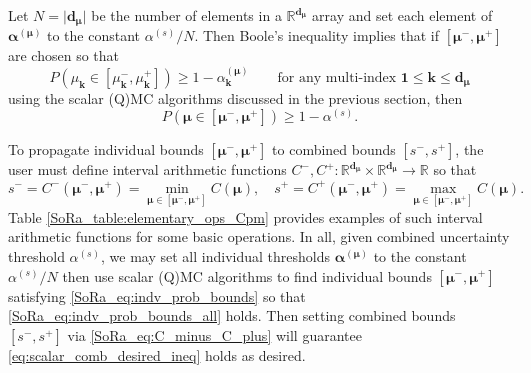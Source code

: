 \documentclass[graybox]{svmult}
\begin{document}
Let $N = \lvert \boldsymbol{d}_{\boldsymbol{\mu}} \rvert$ be the number of elements in a $\mathbb{R}^{\boldsymbol{d}_{\boldsymbol{\mu}}}$ array and set each element of $\boldsymbol{\alpha}^{(\boldsymbol{\mu})}$ to the constant $\alpha^{(s)}/ N$. Then Boole's inequality \cite{boole1847mathematical} implies that if $[\boldsymbol{\mu}^-,\boldsymbol{\mu}^+]$ are chosen so that
\begin{equation}
    P(\mu_{\boldsymbol{k}} \in [\mu_{\boldsymbol{k}}^-,\mu_{\boldsymbol{k}}^+]) \geq 1-\alpha_{\boldsymbol{k}}^{(\boldsymbol{\mu})}  \qquad \text{for any multi-index }\boldsymbol{1} \leq \boldsymbol{k} \leq \boldsymbol{d}_{\boldsymbol{\mu}}
    \label{SoRa_eq:indv_prob_bounds}
\end{equation}
using the scalar (Q)MC algorithms discussed in the previous section, then  
\begin{equation}
    P(\boldsymbol{\mu} \in [\boldsymbol{\mu}^-,\boldsymbol{\mu}^+]) \geq 1-\alpha^{(s)}.
    \label{SoRa_eq:indv_prob_bounds_all}
\end{equation}

To propagate individual bounds $[\boldsymbol{\mu}^-,\boldsymbol{\mu}^+]$ to combined bounds $[s^-,s^+]$, the user must define interval arithmetic \cite{interval_analysis} functions $C^-,C^+: \mathbb{R}^{\boldsymbol{d}_{\boldsymbol{\mu}}} \times \mathbb{R}^{\boldsymbol{d}_{\boldsymbol{\mu}}} \to \mathbb{R}$ so that
\begin{equation}
    s^- = C^-(\boldsymbol{\mu}^-,\boldsymbol{\mu}^+) = \min_{\boldsymbol{\mu} \in [\boldsymbol{\mu}^-,\boldsymbol{\mu}^+]} C(\boldsymbol{\mu}), \quad 
    s^+= C^+(\boldsymbol{\mu}^-,\boldsymbol{\mu}^+) = \max_{\boldsymbol{\mu} \in [\boldsymbol{\mu}^-,\boldsymbol{\mu}^+]} C(\boldsymbol{\mu}).
    \label{SoRa_eq:C_minus_C_plus}
\end{equation}
Table \ref{SoRa_table:elementary_ops_Cpm} provides examples of such interval arithmetic functions for some basic operations. In all, given combined uncertainty threshold $\alpha^{(s)}$, we may set all individual thresholds $\boldsymbol{\alpha}^{(\boldsymbol{\mu})}$ to the constant $\alpha^{(s)}/N$ then use scalar (Q)MC algorithms to find individual bounds $[\boldsymbol{\mu}^-,\boldsymbol{\mu}^+]$ satisfying \eqref{SoRa_eq:indv_prob_bounds} so that \eqref{SoRa_eq:indv_prob_bounds_all} holds. Then setting combined bounds $[s^-,s^+]$ via \eqref{SoRa_eq:C_minus_C_plus} will guarantee \eqref{eq:scalar_comb_desired_ineq} holds as desired.
\end{document}
